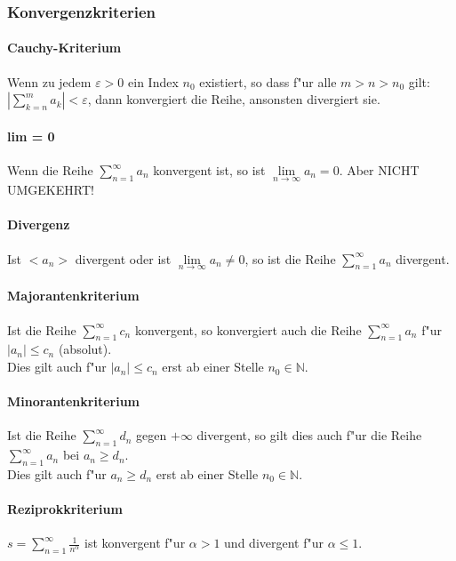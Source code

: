 \subsubsection{Konvergenzkriterien}

\paragraph{Cauchy-Kriterium} 
  Wenn zu jedem $\varepsilon > 0$ ein Index $n_0$ existiert, so dass f"ur alle
  $m > n > n_0$ gilt: \\ $\left| \sum\limits_{k=n}^m a_k \right| < \varepsilon$, dann konvergiert die Reihe, ansonsten divergiert sie.

\paragraph{lim = 0}
  Wenn die Reihe $ \sum\limits_{n=1}^{\infty} a_n $ konvergent ist, so ist
  $\lim\limits_{n \to \infty} a_n = 0$. \hspace{2cm} Aber NICHT UMGEKEHRT!

\paragraph{Divergenz}
  Ist $<a_n>$ divergent oder ist $\lim\limits_{n \to \infty} a_n \neq 0$, so
  ist die Reihe $ \sum\limits_{n=1}^{\infty} a_n $ divergent.

\paragraph{Majorantenkriterium}
  Ist die Reihe $ \sum\limits_{n=1}^{\infty} c_n $ konvergent, so konvergiert
  auch die Reihe $ \sum\limits_{n=1}^{\infty} a_n $ f"ur $|a_n| \leq c_n$ (absolut). \\ Dies gilt auch f"ur $|a_n| \leq c_n$ erst ab einer Stelle $n_0 \in \mathbb{N}$.

\paragraph{Minorantenkriterium}
  Ist die Reihe $ \sum\limits_{n=1}^{\infty} d_n $ gegen $+\infty$ divergent, so
  gilt dies auch f"ur die Reihe $ \sum\limits_{n=1}^{\infty} a_n $ bei $a_n \geq d_n$. \\ Dies gilt auch f"ur $a_n \geq d_n$ erst ab einer Stelle $n_0 \in \mathbb{N}$.

\paragraph{Reziprokkriterium}
  $ s = \sum\limits_{n=1}^{\infty} \frac{1}{n^\alpha} $ ist konvergent f"ur
  $\alpha > 1$ und divergent f"ur $\alpha \leq 1$.


